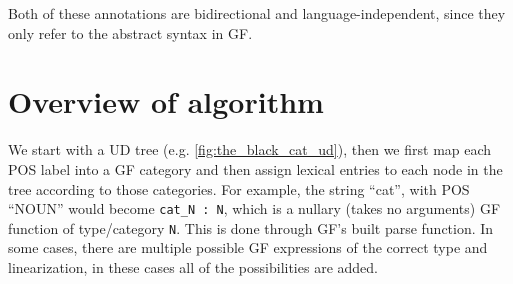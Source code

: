 Both of these annotations are bidirectional and language-independent, since they only refer to the abstract syntax in GF.





% 
% 
% 
% 

\section{Overview of algorithm}

We start with a UD tree (e.g. \autoref{fig:the_black_cat_ud}), then we first map each POS label into a GF category and then assign lexical entries to each node in the tree according to those categories. For example, the string ``cat'', with POS ``NOUN'' would become \lstinline|cat_N : N|, which is a nullary (takes no arguments) GF function of type/category \lstinline|N|. This is done through GF's built parse function. In some cases, there are multiple possible GF expressions of the correct type and linearization, in these cases all of the possibilities are added.

